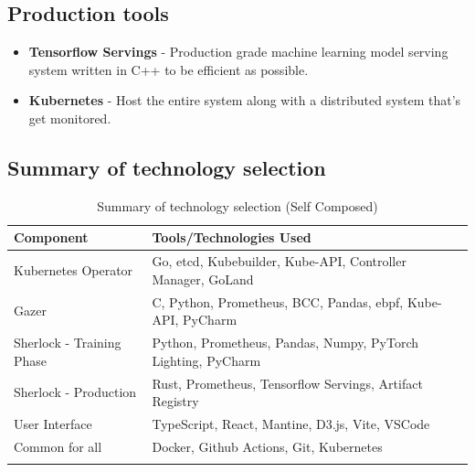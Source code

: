 \subsection{Production tools}
\begin{itemize}
    \item \textbf{Tensorflow Servings} - Production grade machine learning model serving system written in C++ to be efficient as possible.
    \item \textbf{Kubernetes} - Host the entire system along with a distributed system that's get monitored.
\end{itemize}

\subsection{Summary of technology selection}

\begin{longtable}{|p{43mm}|p{110mm}|}
    \hline
    \textbf{Component} &
    \textbf{Tools/Technologies Used} \\ \hline

    Kubernetes Operator &
    Go, etcd, Kubebuilder, Kube-API, Controller Manager, GoLand \\ \hline

    Gazer &
    C, Python, Prometheus, BCC, Pandas, \ac{ebpf}, Kube-API, PyCharm \\ \hline

    Sherlock - Training Phase &
    Python, Prometheus, Pandas, Numpy, PyTorch Lighting, PyCharm \\ \hline

    Sherlock - Production &
    Rust, Prometheus, Tensorflow Servings, Artifact Registry \\ \hline

    User Interface &
    TypeScript, React, Mantine, D3.js, Vite, VSCode \\ \hline

    Common for all &
    Docker, Github Actions, Git, Kubernetes \\ \hline

    \caption{Summary of technology selection (Self Composed)}
\end{longtable}